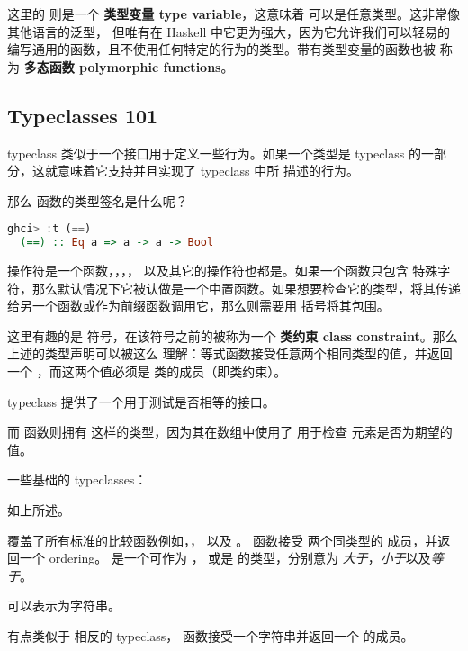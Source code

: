 \documentclass[./main.tex]{subfiles}
\begin{document}
这里的  则是一个 \textbf{类型变量 type variable}，这意味着  可以是任意类型。这非常像其他语言的泛型，
但唯有在 Haskell 中它更为强大，因为它允许我们可以轻易的编写通用的函数，且不使用任何特定的行为的类型。带有类型变量的函数也被
称为 \textbf{多态函数 polymorphic functions}。

\subsection*{Typeclasses 101}

typeclass 类似于一个接口用于定义一些行为。如果一个类型是 typeclass 的一部分，这就意味着它支持并且实现了 typeclass 中所
描述的行为。

那么 \acode{==} 函数的类型签名是什么呢？

\begin{lstlisting}[language=Haskell]
  ghci> :t (==)
  (==) :: Eq a => a -> a -> Bool
\end{lstlisting}

\begin{anote}
  \acode{==} 操作符是一个函数，\acode{+}，\acode{*}，\acode{-}，\acode{/} 以及其它的操作符也都是。如果一个函数只包含
  特殊字符，那么默认情况下它被认做是一个中置函数。如果想要检查它的类型，将其传递给另一个函数或作为前缀函数调用它，那么则需要用
  括号将其包围。
\end{anote}

这里有趣的是 \acode{=>} 符号，在该符号之前的被称为一个 \textbf{类约束 class constraint}。那么上述的类型声明可以被这么
理解：等式函数接受任意两个相同类型的值，并返回一个 ，而这两个值必须是  类的成员（即类约束）。

 typeclass 提供了一个用于测试是否相等的接口。

而  函数则拥有  这样的类型，因为其在数组中使用了 \acode{==} 用于检查
元素是否为期望的值。

一些基础的 typeclasses：

 如上所述。

 覆盖了所有标准的比较函数例如\acode{>}，\acode{<}，\acode{>=} 以及 \acode{<=}。 函数接受
两个同类型的  成员，并返回一个 ordering。 是一个可作为 ， 或是
的类型，分别意为 \textit{大于}，\textit{小于}以及\textit{等于}。

 可以表示为字符串。

 有点类似于  相反的 typeclass， 函数接受一个字符串并返回一个  的成员。
\end{document}
